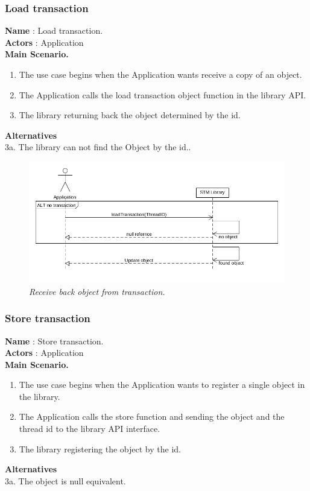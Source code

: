 \documentclass[12pt]{article}
\begin{document}
{\newpage
\subsubsection{Load transaction}
\textbf{Name} : Load transaction.\\
\textbf{Actors} : Application\\
\textbf{Main Scenario.}
\begin{enumerate}
  \item The use case begins when the Application wants receive a copy of an object.
  \item The Application calls the load transaction object function in the library API. 
  \item The library returning back the object determined by the id. 
\end{enumerate}
\textbf{Alternatives}\\
3a. The library can not find the Object by the id..\\

\begin{figure}[h!]
\centering
\includegraphics[scale=0.5]{Pictures/load.png}
\caption{\textit{\color{gray}Receive back object from transaction.}}
\end{figure}

\subsubsection{Store transaction}
\textbf{Name} : Store transaction.\\
\textbf{Actors} : Application\\
\textbf{Main Scenario.}
\begin{enumerate}
  \item The use case begins when the Application wants to register a single object in the library.
  \item The Application calls the store function and sending the object and the thread id to the library API interface.
  \item The library registering the object by the id.
\end{enumerate}
\textbf{Alternatives}\\
3a. The object is null equivalent.\\

}
\end{document}
